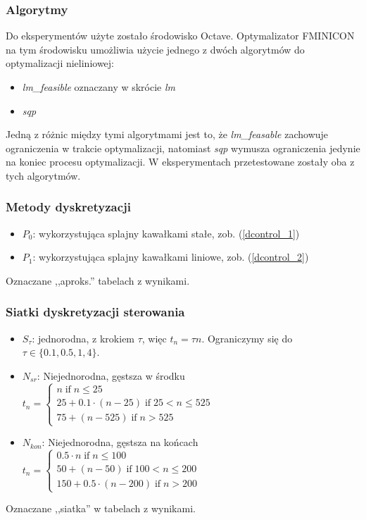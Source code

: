 \documentclass[11pt]{article}
\def\iif{\operatorname{if}}
\begin{document}
\subsubsection{Algorytmy}
Do eksperymentów użyte zostało środowisko Octave. Optymalizator FMINICON na tym środowisku umożliwia użycie jednego z dwóch algorytmów do optymalizacji nieliniowej:
\begin{itemize}
\item{\it lm\_feasible\/} oznaczany w skrócie {\it lm\/}
\item{\it sqp\/}
\end{itemize}
Jedną z różnic między tymi algorytmami jest to, że {\it lm\_feasable\/} zachowuje ograniczenia w trakcie optymalizacji, natomiast {\it sqp\/} wymusza ograniczenia jedynie na koniec procesu optymalizacji. W eksperymentach przetestowane zostały oba z tych algorytmów.
\subsubsection{Metody dyskretyzacji}
\begin{itemize}
\item{$P_0$:} wykorzystująca splajny kawałkami stałe, zob. (\ref{dcontrol_1})
\item{$P_1$:} wykorzystująca splajny kawałkami liniowe, zob. (\ref{dcontrol_2})
\end{itemize}
Oznaczane ,,aproks.'' tabelach z wynikami.
\subsubsection{Siatki dyskretyzacji sterowania}
\begin{itemize}
\item{$S_{\tau}$:} jednorodna, z krokiem $\tau$, więc $t_n = \tau n$. Ograniczymy się do $\tau \in \{0.1, 0.5, 1, 4\}$.
\item{$N_{sr}$: Niejednorodna, gęstsza w środku} $t_n = \begin{cases}
    n \iif n \le 25 \\
    25 + 0.1\cdot(n-25) \iif 25 < n \le 525 \\
    75 + (n - 525) \iif n > 525
  \end{cases}$
\item{$N_{kon}$: Niejednorodna, gęstsza na końcach} $t_n = \begin{cases}
    0.5\cdot n \iif n \le 100 \\
    50 + (n - 50) \iif 100 < n \le 200 \\
    150 + 0.5\cdot (n - 200) \iif n > 200
  \end{cases}$
\end{itemize}
Oznaczane ,,siatka'' w tabelach z wynikami.
\end{document}
